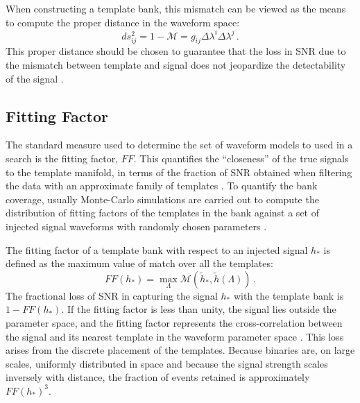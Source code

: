 \documentclass[binding=0.6cm, LaM]{sapthesis}
\begin{document}
        When constructing a template bank, this mismatch can be viewed as the means
	to compute the proper distance in the waveform space:
        \begin{equation}
          ds_{ij}^2 = 1 − \mathcal{M} = g_{ij} \Delta \lambda^i \Delta \lambda^j\,.
        \end{equation}
	This proper distance should be chosen to guarantee that the loss in SNR due to the mismatch 
	between template and signal does not jeopardize the detectability of the signal \cite{30}.

\subsection{Fitting Factor}
\label{subsec:fittingfactor}
	The standard measure used to determine the set of waveform models to used in a
        search is the fitting factor, $FF$.
	This quantifies the ``closeness'' of 
	the true signals to the template manifold, in terms of the fraction of 
	SNR obtained when filtering 
	the data with an approximate family of templates \cite{31}. 
	To quantify the bank coverage, usually Monte-Carlo simulations are carried out   
	to compute the distribution of fitting factors of the templates in the bank against 
	a set of injected signal waveforms with randomly chosen parameters \cite{32}.

	The fitting factor of a template bank with respect to an injected signal $h_{*}$ 
	is defined as the maximum value of match over all the templates:
        \begin{equation}
          FF(h_{*}) = \max_\Lambda \mathcal{M}(\tilde{h}_{*}, \tilde{h}(\Lambda))\,.
        \end{equation}
	The fractional loss of SNR in capturing the signal 
	$h_{*}$ with the template bank is $1 - FF(h_{*})$.
	If the fitting factor is less than unity, the signal lies outside the parameter space, 
	and the fitting factor represents the cross-correlation between 
	the signal and its nearest template in the waveform parameter space \cite{33}. 
	This loss arises from the discrete placement of the templates. 
	Because binaries are, on large scales, uniformly distributed in space 
	and because the signal strength scales inversely with distance, 
	the fraction of events retained is approximately $FF(h_*)^3$.
\end{document}
